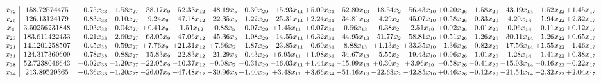 \documentclass[9pt]{article}
\begin{document}
 \[\begin{array}{c| c c@{\hskip 2pt} c@{\hskip 2pt} c@{\hskip 2pt} c@{\hskip 2pt} c@{\hskip 2pt} c@{\hskip 2pt} c@{\hskip 2pt} c@{\hskip 2pt} c@{\hskip 2pt} c@{\hskip 2pt} c@{\hskip 2pt} c@{\hskip 2pt} c@{\hskip 2pt} c@{\hskip 2pt} c@{\hskip 2pt} c@{\hskip 2pt} }
 x_{32}   &  158.72574475 & -0.75 x_{33} & -1.58 x_{27} & -38.17 x_{9} & -52.33 x_{12} & -48.19 x_{5} & -0.30 x_{29} & + 15.93 x_{11} & +  5.09 x_{34} & -52.80 x_{13} & -18.54 x_{2} & -56.43 x_{10} & +  0.20 x_{26} & -1.58 x_{20} & -43.19 x_{14} & -1.52 x_{22} & +  1.45 x_{17}\\
 x_{25}   &  126.13124179 & -0.83 x_{33} & +  0.10 x_{27} & -9.24 x_{9} & -47.18 x_{12} & -22.35 x_{5} & +  1.22 x_{29} & + 25.31 x_{11} & +  2.24 x_{34} & -34.81 x_{13} & -4.29 x_{2} & -45.07 x_{10} & +  0.58 x_{26} & -0.33 x_{20} & -4.20 x_{14} & -1.94 x_{22} & +  2.32 x_{17}\\
 x_{4}   &  3.50256231848 & -0.03 x_{33} & +  0.04 x_{27} & +  0.41 x_{9} & -1.51 x_{12} & -0.88 x_{5} & +  0.07 x_{29} & +  1.45 x_{11} & +  0.07 x_{34} & -0.66 x_{13} & -0.38 x_{2} & -2.51 x_{10} & +  0.02 x_{26} & -0.01 x_{20} & +  0.06 x_{14} & -0.11 x_{22} & +  0.12 x_{17}\\
 x_{23}   &  183.611422433 & +  0.21 x_{33} & -2.60 x_{27} & -63.05 x_{9} & -47.06 x_{12} & -45.36 x_{5} & +  1.08 x_{29} & + 14.55 x_{11} & +  6.32 x_{34} & -44.95 x_{13} & -51.77 x_{2} & -58.81 x_{10} & +  0.51 x_{26} & -1.26 x_{20} & -30.11 x_{14} & -1.26 x_{22} & +  0.65 x_{17}\\
 x_{21}   &  14.1201258507 & +  0.45 x_{33} & -0.59 x_{27} & +  7.76 x_{9} & + 21.31 x_{12} & +  7.66 x_{5} & -1.87 x_{29} & -23.85 x_{11} & -0.69 x_{34} & -8.88 x_{13} & +  1.13 x_{2} & + 33.35 x_{10} & -1.36 x_{26} & -0.82 x_{20} & -17.56 x_{14} & +  1.55 x_{22} & -1.46 x_{17}\\
 x_{31}   &  124.317360609 & -0.78 x_{33} & -0.88 x_{27} & -15.83 x_{9} & -22.83 x_{12} & -21.29 x_{5} & +  0.43 x_{29} & +  6.95 x_{11} & +  1.98 x_{34} & -34.67 x_{13} & -5.55 x_{2} & -19.43 x_{10} & +  0.96 x_{26} & -1.01 x_{20} & -1.28 x_{14} & -1.41 x_{22} & +  0.38 x_{17}\\
 x_{28}   &  52.7238046643 & +  0.02 x_{33} & -1.29 x_{27} & -22.95 x_{9} & -10.37 x_{12} & -9.08 x_{5} & -0.31 x_{29} & -16.03 x_{11} & +  1.44 x_{34} & -15.99 x_{13} & +  0.30 x_{2} & +  3.96 x_{10} & -0.58 x_{26} & -0.41 x_{20} & -15.93 x_{14} & -0.16 x_{22} & -0.22 x_{17}\\
 x_{24}   &  213.89529365 & -0.36 x_{33} & -1.20 x_{27} & -26.07 x_{9} & -47.48 x_{12} & -30.96 x_{5} & +  1.40 x_{29} & +  3.48 x_{11} & +  3.66 x_{34} & -51.16 x_{13} & -22.63 x_{2} & -42.85 x_{10} & +  0.46 x_{26} & -0.12 x_{20} & -21.54 x_{14} & -2.32 x_{22} & +  2.04 x_{17}\\

\end{array}\]
\end{document}
